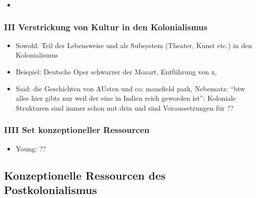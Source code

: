 \documentclass[emulatestandardclasses]{scrartcl}
\begin{document}
\begin{itemize}
  \item 
\end{itemize}

\subsubsection{III Verstrickung von Kultur in den Kolonialismus}

\begin{itemize}
  \item Sowohl: Teil der Lebensweise und als Subsystem (Theater, Kunst etc.) in den Kolonialismus
  \item Beispiel: Deutsche Oper schwarzer der Mozart, Entführung von x, 
  \item Said: die Geschichten von AUsten und co; mansfield park, Nebensatz: "`btw alles hier gibts nur weil der eine in Indien reich geworden ist"'; Koloniale Strukturen sind immer schon mit drin und sind Voraussetzungen für ??
\end{itemize}

\subsubsection{IIII Set konzeptioneller Ressourcen}

\begin{itemize}
  \item Young: ??
\end{itemize}


\subsection{Konzeptionelle Ressourcen des Postkolonialismus}
\end{document}
